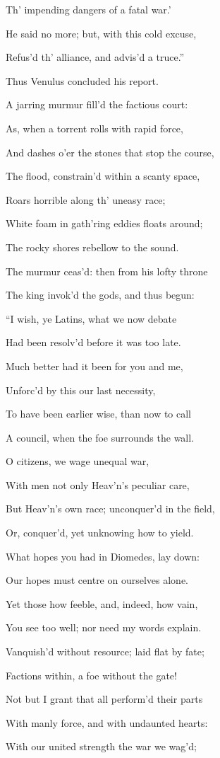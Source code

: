 Th’ impending dangers of a fatal war.’

He said no more; but, with this cold excuse,

Refus’d th’ alliance, and advis’d a truce.”

Thus Venulus concluded his report.

A jarring murmur fill’d the factious court:

As, when a torrent rolls with rapid force,

And dashes o’er the stones that stop the course,

The flood, constrain’d within a scanty space,

Roars horrible along th’ uneasy race;

White foam in gath’ring eddies floats around;

The rocky shores rebellow to the sound.

The murmur ceas’d: then from his lofty throne

The king invok’d the gods, and thus begun:

“I wish, ye Latins, what we now debate

Had been resolv’d before it was too late.

Much better had it been for you and me,

Unforc’d by this our last necessity,

To have been earlier wise, than now to call

A council, when the foe surrounds the wall.

O citizens, we wage unequal war,

With men not only Heav’n’s peculiar care,

But Heav’n’s own race; unconquer’d in the field,

Or, conquer’d, yet unknowing how to yield.

What hopes you had in Diomedes, lay down:

Our hopes must centre on ourselves alone.

Yet those how feeble, and, indeed, how vain,

You see too well; nor need my words explain.

Vanquish’d without resource; laid flat by fate;

Factions within, a foe without the gate!

Not but I grant that all perform’d their parts

With manly force, and with undaunted hearts:

With our united strength the war we wag’d;

